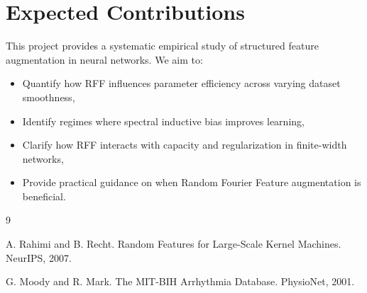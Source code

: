 \documentclass[11pt]{article}
\begin{document}
\section{Expected Contributions}

This project provides a systematic empirical study of structured feature augmentation in neural networks. We aim to:

\begin{itemize}
    \item Quantify how RFF influences parameter efficiency across varying dataset smoothness,
    \item Identify regimes where spectral inductive bias improves learning,
    \item Clarify how RFF interacts with capacity and regularization in finite-width networks,
    \item Provide practical guidance on when Random Fourier Feature augmentation is beneficial.
\end{itemize}


\begin{thebibliography}{9}

A. Rahimi and B. Recht.
Random Features for Large-Scale Kernel Machines.
NeurIPS, 2007.

G. Moody and R. Mark.
The MIT-BIH Arrhythmia Database.
PhysioNet, 2001.

\end{thebibliography}
\end{document}
